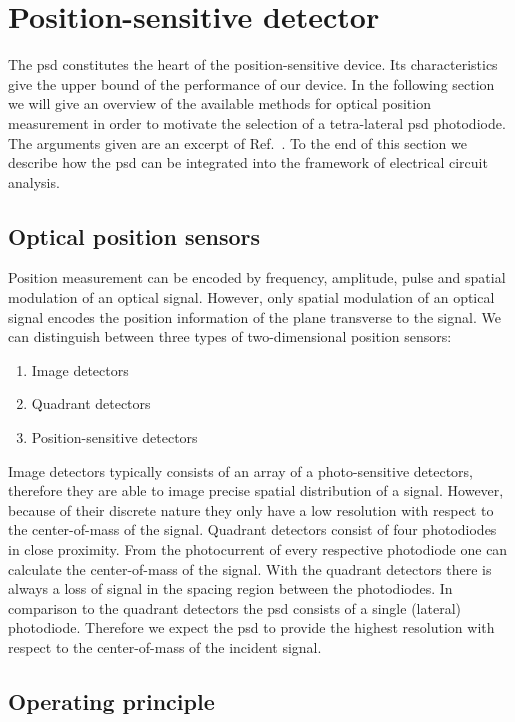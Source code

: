 \section{Position-sensitive detector}

The \gls{psd} constitutes the heart of the position-sensitive device.
Its characteristics give the upper bound of the performance of our device.
In the following section we will give an overview of the available methods for optical position measurement in order to motivate the selection of a tetra-lateral \gls{psd} photodiode.
The arguments given are an excerpt of Ref.~\cite{Noorlag74}.
To the end of this section we describe how the \gls{psd} can be integrated into the framework of electrical circuit analysis.

\subsection{Optical position sensors}

Position measurement can be encoded by frequency, amplitude, pulse and spatial modulation of an optical signal.
However, only spatial modulation of an optical signal encodes the position information of the plane transverse to the signal.
We can distinguish between three types of two-dimensional position sensors:
\begin{enumerate}
	\item Image detectors
	\item Quadrant detectors
	\item Position-sensitive detectors
\end{enumerate}
Image detectors typically consists of an array of a photo-sensitive detectors, therefore they are able to image precise spatial distribution of a signal.
However, because of their discrete nature they only have a low resolution with respect to the center-of-mass of the signal.
Quadrant detectors consist of four photodiodes in close proximity.
From the photocurrent of every respective photodiode one can calculate the center-of-mass of the signal.
With the quadrant detectors there is always a loss of signal in the spacing region between the photodiodes.
In comparison to the quadrant detectors the \gls{psd} consists of a single (lateral) photodiode.
Therefore we expect the \gls{psd} to provide the highest resolution with respect to the center-of-mass of the incident signal.

\subsection{Operating principle}

